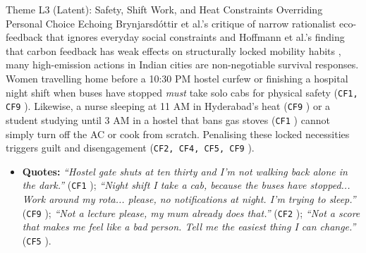 \documentclass[12pt, a4paper]{article}
\begin{document}
\begin{latentcard}{Theme L3 (Latent): Safety, Shift Work, and Heat Constraints Overriding Personal Choice}
Echoing Brynjarsd\'{o}ttir et al.'s critique of narrow rationalist eco-feedback that ignores everyday social constraints \cite{brynjarsdottir2012} and Hoffmann et al.'s finding that carbon feedback has weak effects on structurally locked mobility habits \cite{hoffmann2024}, many high-emission actions in Indian cities are non-negotiable survival responses. Women travelling home before a 10:30 PM hostel curfew or finishing a hospital night shift when buses have stopped \textit{must} take solo cabs for physical safety (\texttt{CF1, CF9} \cite{cf1, cf9}). Likewise, a nurse sleeping at 11 AM in Hyderabad's heat (\texttt{CF9} \cite{cf9}) or a student studying until 3 AM in a hostel that bans gas stoves (\texttt{CF1} \cite{cf1}) cannot simply turn off the AC or cook from scratch. Penalising these locked necessities triggers guilt and disengagement (\texttt{CF2, CF4, CF5, CF9} \cite{cf2, cf4, cf5, cf9}).
\begin{itemize}
    \item \textbf{Quotes:} \textit{``Hostel gate shuts at ten thirty and I'm not walking back alone in the dark.''} (\texttt{CF1} \cite{cf1}); \textit{``Night shift I take a cab, because the buses have stopped... Work around my rota... please, no notifications at night. I'm trying to sleep.''} (\texttt{CF9} \cite{cf9}); \textit{``Not a lecture please, my mum already does that.''} (\texttt{CF2} \cite{cf2}); \textit{``Not a score that makes me feel like a bad person. Tell me the easiest thing I can change.''} (\texttt{CF5} \cite{cf5}).
\end{itemize}
\end{latentcard}

\end{document}
